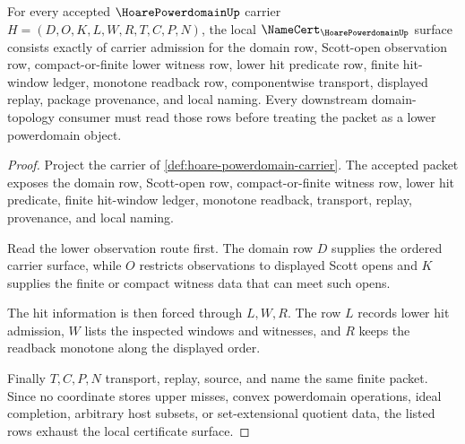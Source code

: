 \begin{theorem}
\label{thm:hoare-powerdomain-namecert-obligations}
For every accepted $\HoarePowerdomainUp$ carrier $H=(D,O,K,L,W,R,T,C,P,N)$, the local $\NameCert_{\HoarePowerdomainUp}$ surface consists exactly of carrier admission for the domain row, Scott-open observation row, compact-or-finite lower witness row, lower hit predicate row, finite hit-window ledger, monotone readback row, componentwise transport, displayed replay, package provenance, and local naming. Every downstream domain-topology consumer must read those rows before treating the packet as a lower powerdomain object.
\end{theorem}
\begin{proof}
Project the carrier of \autoref{def:hoare-powerdomain-carrier}. The accepted packet exposes the domain row, Scott-open row, compact-or-finite witness row, lower hit predicate, finite hit-window ledger, monotone readback, transport, replay, provenance, and local naming.

Read the lower observation route first. The domain row $D$ supplies the ordered carrier surface, while $O$ restricts observations to displayed Scott opens and $K$ supplies the finite or compact witness data that can meet such opens.

The hit information is then forced through $L,W,R$. The row $L$ records lower hit admission, $W$ lists the inspected windows and witnesses, and $R$ keeps the readback monotone along the displayed order.

Finally $T,C,P,N$ transport, replay, source, and name the same finite packet. Since no coordinate stores upper misses, convex powerdomain operations, ideal completion, arbitrary host subsets, or set-extensional quotient data, the listed rows exhaust the local certificate surface.
\end{proof}


